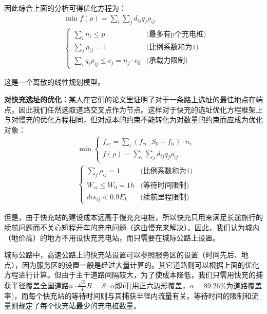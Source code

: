 \documentclass[12pt, a4paper, oneside]{ctexart}
\begin{document}
因此综合上面的分析可得优化方程为：
\begin{equation}
    \begin{aligned}
         & \min  f(\rho)=\sum_i \sum_jd_{ij} q_j \rho_{ij} \\
         & \begin{cases}
            \sum\limits_i n_i\leqslant p                                     & \text{(最多有p个充电桩)} \\
            \sum\limits_j \rho_{ij}=1                               & \text{(比例系数和为1)} \\
            \sum\limits_i q_{i}\rho_{ij}\leqslant c_j=n_j \cdot c_0 & \text{(承载力限制)}
        \end{cases}
    \end{aligned}
    \label{fun:优化lc}
\end{equation}

这是一个离散的线性规划模型。

\textbf{对快充选址的优化：}某人在它们的论文里证明了对于一条路上选址的最佳地点在端点，因此我们任然选取道路交叉点作为节点。这样对于快充的选址优化方程框架上与对慢充的优化方程相同，但对成本的约束不能转化为对数量的约束而应成为优化对象：
\begin{equation}
    \begin{aligned}
        & \min  \begin{cases}
            f_{sc}=\sum\limits_{i}(f_{ci}\cdot S_0+f_{li})\cdot n_i\\
            f(\rho)=\sum_i \sum_jd_{ij} q_j \rho_{ij}
        \end{cases} \\
        & \begin{cases}
           \sum\limits_j \rho_{ij}=1    & \text{(比例系数和为1)} \\
           W_{si}\leqslant W_0=1h & \text{(等待时间限制)}\\
           dis_{ij}<0.9E_k&\text{(续航里程限制)}
       \end{cases}
    \end{aligned}
\end{equation}

但是，由于快充站的建设成本远高于慢充充电桩，所以快充只用来满足长途旅行的续航问题而不关心短程开车的充电问题（这由慢充来解决）。因此，我们认为城内（地价高）的地方不用设快充充电站，而只需要在城际公路上设置。

城际公路中，高速公路上的快充站设置可以参照服务区的设置（时间先后、地点），因为服务区的设置一般是经过大量计算的。其它道路则可以根据上面的优化方程进行计算。但由于主干道路间隔较大，为了使成本降低，我们只需用快充的捕获半径覆盖全国道路\(n\cdot \frac{\sqrt3}{4}R = S\cdot \alpha\)即可(用正六边形覆盖，\(\alpha=89.26\%\)为道路覆盖率)，而每个快充站的等待时间则与其捕获半径内流量有关。等待时间的限制和流量则规定了每个快充站最少的充电桩数量。
\end{document}
